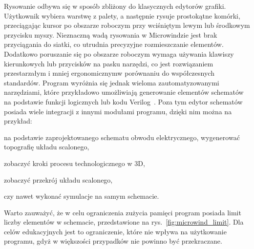 \indent Rysowanie odbywa się w sposób zbliżony do klasycznych edytorów grafiki.
Użytkownik wybiera warstwę z palety,
a następnie rysuje prostokątne komórki,
przeciągając kursor po obszarze roboczym przy wciśniętym lewym lub środkowym przycisku myszy. 
Nieznaczną wadą rysowania w Microwindzie jest brak przyciągania do siatki,
co utrudnia precyzyjne rozmieszczanie elementów.
Dodatkowo poruszanie się po obszarze roboczym wymaga używania klawiszy kierunkowych lub przycisków na pasku narzędzi,
co jest rozwiązaniem przestarzałym i mniej ergonomicznym\linebreak w porównaniu do współczesnych standardów.
Program wyróżnia się jednak wieloma zautomatyzowanymi narzędziami,
które przykładowo umożliwiają generowanie elementów schematów na podstawie funkcji logicznych lub kodu Verilog~\cite{microwind_operation_commands}. 
Poza tym edytor schematów posiada wiele integracji z innymi modułami programu,
dzięki nim można na przykład:
\begin{citemize}
    \item na podstawie zaprojektowanego schematu obwodu elektrycznego, wygenerować topografię układu scalonego,
    \item zobaczyć kroki procesu technologicznego w 3D,
    \item zobaczyć przekrój układu scalonego,
    \item czy nawet wykonać symulacje na samym schemacie.
\end{citemize}
Warto zauważyć, że w celu ograniczenia zużycia pamięci program posiada limit liczby elementów w schemacie,
przedstawione na rys.~\ref{fig:microwind_limit}.
Dla celów edukacyjnych jest to ograniczenie, które nie wpływa na użytkowanie programu,
gdyż w większości przypadków nie powinno być przekraczane.

